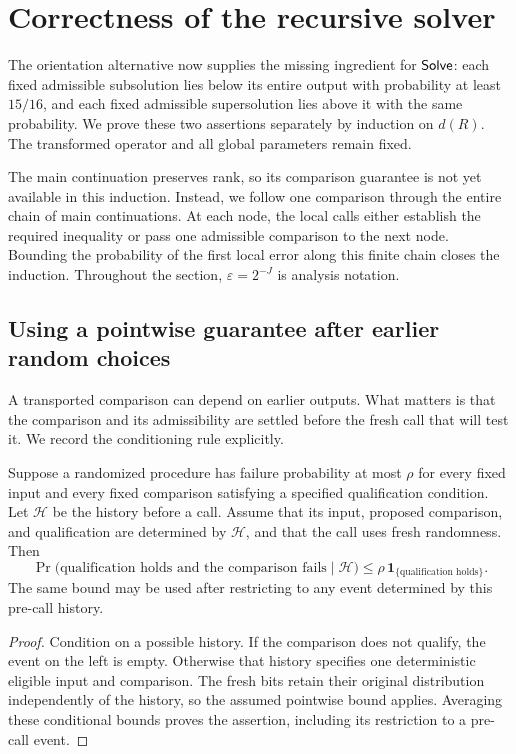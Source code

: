 \section{Correctness of the recursive solver}
\label{sec:solving}

The orientation alternative now supplies the missing ingredient for
\(\mathsf{Solve}\): each fixed admissible subsolution lies below its entire
output with probability at least \(15/16\), and each fixed admissible
supersolution lies above it with the same probability. We prove these
two assertions separately by induction on \(d(R)\). The transformed
operator and all global parameters remain fixed.

The main continuation preserves rank, so its comparison guarantee is
not yet available in this induction. Instead, we follow one comparison
through the entire chain of main continuations. At each node, the
local calls either establish the required inequality or pass one
admissible comparison to the next node. Bounding the probability of
the first local error along this finite chain closes the induction.
Throughout the section, \(\varepsilon=2^{-J}\) is analysis notation.

\subsection{Using a pointwise guarantee after earlier random choices}

A transported comparison can depend on earlier outputs. What matters
is that the comparison and its admissibility are settled before the
fresh call that will test it. We record the conditioning rule explicitly.

\begin{lemma}
\label{sol:conditioning}
Suppose a randomized procedure has failure probability at most \(\rho\)
for every fixed input and every fixed comparison satisfying a specified
qualification condition. Let \(\mathcal H\) be the history before a
call. Assume that its input, proposed comparison, and qualification are
determined by \(\mathcal H\), and that the call uses fresh randomness.
Then
\[
 \Pr\bigl(\text{qualification holds and the comparison fails}
              \mid\mathcal H\bigr)
 \le \rho\,\mathbf 1_{\{\text{qualification holds}\}}.
\]
The same bound may be used after restricting to any event determined
by this pre-call history.
\end{lemma}

\begin{proof}
Condition on a possible history. If the comparison does not qualify,
the event on the left is empty. Otherwise that history specifies one
deterministic eligible input and comparison. The fresh bits retain
their original distribution independently of the history, so the
assumed pointwise bound applies. Averaging these conditional bounds
proves the assertion, including its restriction to a pre-call event.
\end{proof}

